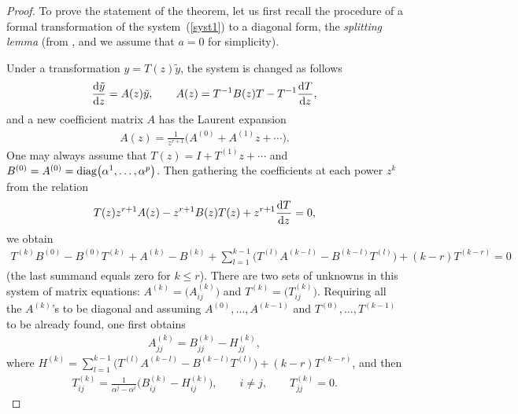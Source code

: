 \begin{proof} To prove the statement of the theorem, let us first recall the procedure of a formal transformation of the
system~(\ref{syst1}) to a diagonal form, the {\it splitting lemma} (from \cite[Section~11]{Wa}, and we assume that $a=0$ for simplicity).

Under a transformation $y=T(z)\tilde y$, the system is changed as follows
\begin{gather*}
\frac{{\rm d}\tilde y}{{\rm d}z}=A(z) \tilde y, \qquad A(z)=T^{-1}B(z)T-T^{-1}\frac{{\rm d}T}{{\rm d}z},
\end{gather*}
and a new coefficient matrix $A$ has the Laurent expansion
\begin{gather*}
A(z)=\frac1{z^{r+1}}\bigl(A^{(0)}+A^{(1)}z+\cdots\bigr).
\end{gather*}
One may always assume that $T(z)=I+T^{(1)}z+\cdots$ and $B^{(0)}=A^{(0)}={\rm diag}\big(\alpha^1,\ldots,\alpha^p\big)$. Then gathering the coefficients at each power $z^k$ from the relation
\begin{gather*}
T(z) z^{r+1}A(z)-z^{r+1}B(z) T(z)+z^{r+1}\frac{{\rm d}T}{{\rm d}z}=0,
\end{gather*}
we obtain
\begin{gather*}
T^{(k)}B^{(0)}-B^{(0)}T^{(k)}+A^{(k)}-B^{(k)}+\sum_{l=1}^{k-1}\big(T^{(l)}A^{(k-l)}-B^{(k-l)}T^{(l)}\big)+(k-r)T^{(k-r)}=0
\end{gather*}
(the last summand equals zero for $k\leqslant r$). There are two sets of unknowns in this system of matrix equations:
$A^{(k)}=\big(A^{(k)}_{ij}\big)$ and $T^{(k)}=\big(T^{(k)}_{ij}\big)$. Requiring all the $A^{(k)}$'s to be diagonal and assuming
$A^{(0)},\ldots,A^{(k-1)}$ and $T^{(0)},\ldots,T^{(k-1)}$ to be already found, one first obtains
\begin{gather*}
A^{(k)}_{jj}=B^{(k)}_{jj}-H^{(k)}_{jj},
\end{gather*}
where $H^{(k)}=\sum\limits_{l=1}^{k-1}\big(T^{(l)}A^{(k-l)}-B^{(k-l)}T^{(l)}\big)+(k-r)T^{(k-r)}$, and then
\begin{gather*}
T^{(k)}_{ij}=\frac1{\alpha^j-\alpha^i}\bigl(B^{(k)}_{ij}-H^{(k)}_{ij}\bigr),\qquad i\ne j, \qquad T^{(k)}_{jj}=0.
\end{gather*}


\end{proof}
